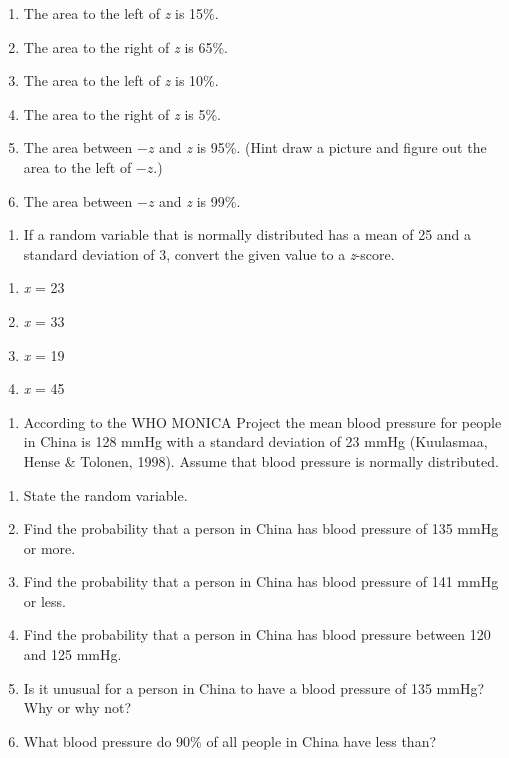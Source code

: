 \documentclass[]{book}
\providecommand{\tightlist}{%
  \setlength{\itemsep}{0pt}\setlength{\parskip}{0pt}}
\begin{document}
\begin{enumerate}
\def\labelenumi{\alph{enumi}.}
\tightlist
\item
  The area to the left of \emph{z} is 15\%.
\item
  The area to the right of \emph{z} is 65\%.
\item
  The area to the left of \emph{z} is 10\%.
\item
  The area to the right of \emph{z} is 5\%.
\item
  The area between \(-z\) and \emph{z} is 95\%. (Hint draw a picture and figure out the area to the left of \(-z\).)
\item
  The area between \(-z\) and \emph{z} is 99\%.
\end{enumerate}

\begin{enumerate}
\def\labelenumi{\arabic{enumi}.}
\setcounter{enumi}{2}
\tightlist
\item
  If a random variable that is normally distributed has a mean of 25 and a standard deviation of 3, convert the given value to a \emph{z}-score.
\end{enumerate}

\begin{enumerate}
\def\labelenumi{\alph{enumi}.}
\tightlist
\item
  \emph{x} = 23
\item
  \emph{x} = 33
\item
  \emph{x} = 19
\item
  \emph{x} = 45
\end{enumerate}

\begin{enumerate}
\def\labelenumi{\arabic{enumi}.}
\setcounter{enumi}{3}
\tightlist
\item
  According to the WHO MONICA Project the mean blood pressure for people in China is 128 mmHg with a standard deviation of 23 mmHg (Kuulasmaa, Hense \& Tolonen, 1998). Assume that blood pressure is normally distributed.
\end{enumerate}

\begin{enumerate}
\def\labelenumi{\alph{enumi}.}
\tightlist
\item
  State the random variable.
\item
  Find the probability that a person in China has blood pressure of 135 mmHg or more.
\item
  Find the probability that a person in China has blood pressure of 141 mmHg or less.
\item
  Find the probability that a person in China has blood pressure between 120 and 125 mmHg.
\item
  Is it unusual for a person in China to have a blood pressure of 135 mmHg? Why or why not?
\item
  What blood pressure do 90\% of all people in China have less than?
\end{enumerate}
\end{document}
